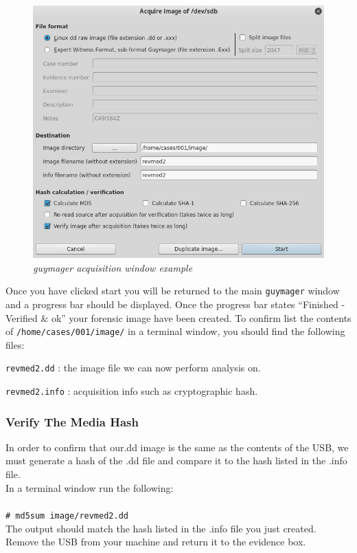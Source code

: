 \documentclass[a4paper,11pt]{article}
\begin{document}
\begin{figure}[h]
	\centering
	\includegraphics[scale=0.5]{guymager-aquisition-window}
	\caption{\textit{guymager acquisition window example}}
	\label{fig:guymager-aquisition-window}
\end{figure}

\newpage
Once you have clicked start you will be returned to the main \texttt{guymager} window and a progress bar should be displayed. Once the progress bar states ``Finished - Verified {\&} ok'' your forensic image have been created. To confirm list the contents of \texttt{/home/cases/001/image/} in a terminal window, you should find the following files: 
\begin{itemize*}
\item \texttt{revmed2.dd} : the image file we can now perform analysis on.
\item \texttt{revmed2.info} : acquisition info such as cryptographic hash.
\end{itemize*}

\subsubsection*{Verify The Media Hash}
In order to confirm that our.dd image is the same as the contents of the USB, we must generate a hash of the .dd file and compare it to the hash listed in the .info file.
\\
In a terminal window run the following:\\ \\
\texttt{{\#} md5sum image/revmed2.dd}\\
The output should match the hash listed in the .info file you just created.\\

\noindent
Remove the USB from your machine and return it to the evidence box.

\end{document}
